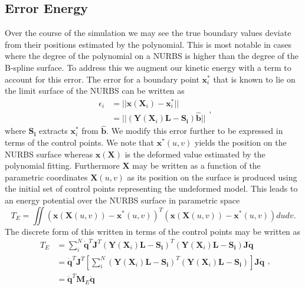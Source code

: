 \subsection{Error Energy}
Over the course of the simulation we may see the true boundary values deviate from their positions estimated by the polynomial. This is most notable in cases where the degree of the polynomial on a NURBS is higher than the degree of the B-spline surface. To address this we augment our kinetic energy with a term to account for this error. The error for a boundary point $\mathbf{x}_i^*$ that is known to lie on the limit surface of the NURBS can be written as
\begin{equation}
\begin{split}
\epsilon_i & = ||\mathbf{x}(\mathbf{X}_i) - \mathbf{x}_i^*|| \\
		   & = ||(\mathbf{Y}(\mathbf{X}_i)\mathbf{L} - \mathbf{S_i})\mathbf{\hat{b}}||
\end{split}
\text{,}
\end{equation}
where $\mathbf{S_i}$ extracts $\mathbf{x}_i^*$ from $\mathbf{\hat{b}}$. We modify this error further to be expressed in terms of the control points. We note that $\mathbf{x}^*(u,v)$ yields the position on the NURBS surface whereas $\mathbf{x(X)}$ is the deformed value estimated by the polynomial fitting. Furthermore $\mathbf{X}$ may be written as a function of the parametric coordinates $\mathbf{X}(u,v)$ as its position on the surface is produced using the initial set of control points representing the undeformed model. This leads to an energy potential over the NURBS surface in parametric space
\begin{equation}
T_E = \iint (\mathbf{x}(\mathbf{X}(u,v)) - \mathbf{x}^*(u,v))^T(\mathbf{x}(\mathbf{X}(u,v)) - \mathbf{x}^*(u,v)) du dv
\text{.}
\end{equation}
The discrete form of this written in terms of the control points may be written as
\begin{equation}
\begin{split}
T_E & = \sum_i^N  \dot{\mathbf{q}}^T\mathbf{J}^T(\mathbf{Y}(\mathbf{X}_i)\mathbf{L} - \mathbf{S_i})^T(\mathbf{Y}(\mathbf{X}_i)\mathbf{L} - \mathbf{S_i})\mathbf{J}\dot{\mathbf{q}} \\
  & = \dot{\mathbf{q}}^T\mathbf{J}^T \left[ \sum_i^N  (\mathbf{Y}(\mathbf{X}_i)\mathbf{L} - \mathbf{S_i})^T(\mathbf{Y}(\mathbf{X}_i)\mathbf{L} - \mathbf{S_i}) \right] \mathbf{J}\dot{\mathbf{q}} \\
  & = \dot{\mathbf{q}}^T \mathbf{M}_E \dot{\mathbf{q}}
\end{split}
\text{,}
\end{equation}
